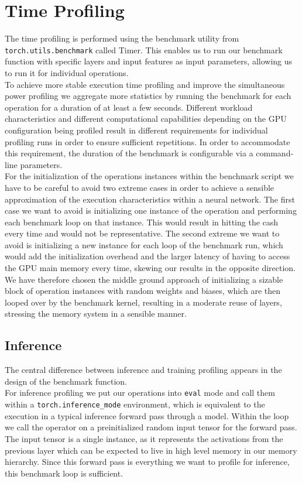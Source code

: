 \section{Time Profiling}



The time profiling is performed using the benchmark utility from \texttt{torch.utils.benchmark} called Timer. This enables us to run our benchmark function with specific layers and input features as input parameters, allowing us to run it for individual operations. \\
To achieve more stable execution time profiling and improve the simultaneous power profiling we aggregate more statistics by running the benchmark for each operation for a duration of at least a few seconds. Different workload characteristics and different computational capabilities depending on the GPU configuration being profiled result in different requirements for individual profiling runs in order to ensure sufficient repetitions. In order to accommodate this requirement, the duration of the benchmark is configurable via a command-line parameters. \\
For the initialization of the operations instances within the benchmark script we have to be careful to avoid two extreme cases in order to achieve a sensible approximation of the execution characteristics within a neural network. The first case we want to avoid is initializing one instance of the operation and performing each benchmark loop on that instance. This would result in hitting the cash every time and would not be representative. The second extreme we want to avoid is initializing a new instance for each loop of the benchmark run, which would add the initialization overhead and the larger latency of having to access the GPU main memory every time, skewing our results in the opposite direction. We have therefore chosen the middle ground approach of initializing a sizable block of operation instances with random weights and biases, which are then looped over by the benchmark kernel, resulting in a moderate reuse of layers, stressing the memory system in a sensible manner. \\


\subsection{Inference}
The central difference between inference and training profiling appears in the design of the benchmark function. \\
For inference profiling we put our operations into \texttt{eval} mode and call them within a \texttt{torch.inference\_mode} environment, which is equivalent to the execution in a typical inference forward pass through a model. Within the loop we call the operator on a preinitialized random input tensor for the forward pass. The input tensor is a single instance, as it represents the activations from the previous layer which can be expected to live in high level memory in our memory hierarchy. Since this forward pass is everything we want to profile for inference, this benchmark loop is sufficient.

